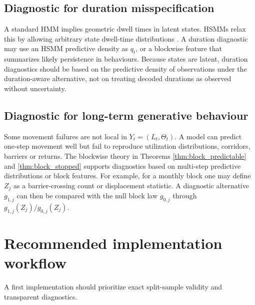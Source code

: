 \documentclass[pdflatex,sn-basic]{sn-jnl}
\theoremstyle{thmstyleone}
\theoremstyle{thmstyletwo}
\theoremstyle{thmstylethree}
\newcommand{\1}{\mathbf 1}
\begin{document}
\subsection{Diagnostic for duration misspecification}

A standard HMM implies geometric dwell times in latent states. HSMMs relax this by allowing arbitrary state dwell-time distributions \citep{langrock_zucchini_2011_dwell}. A duration diagnostic may use an HSMM predictive density as $q_t$, or a blockwise feature that summarizes likely persistence in behaviours. Because states are latent, duration diagnostics should be based on the predictive density of observations under the duration-aware alternative, not on treating decoded durations as observed without uncertainty.

\subsection{Diagnostic for long-term generative behaviour}

Some movement failures are not local in $Y_t=(L_t,\Theta_t)$. A model can predict one-step movement well but fail to reproduce utilization distributions, corridors, barriers or returns. The blockwise theory in Theorems \ref{thm:block_predictable} and \ref{thm:block_stopped} supports diagnostics based on multi-step predictive distributions or block features. For example, for a monthly block one may define $Z_j$ as a barrier-crossing count or displacement statistic. A diagnostic alternative $g_{1,j}$ can then be compared with the null block law $g_{0,j}$ through $g_{1,j}(Z_j)/g_{0,j}(Z_j)$.

\section{Recommended implementation workflow}
\label{sec:algorithm}

A first implementation should prioritize exact split-sample validity and transparent diagnostics.
\end{document}
